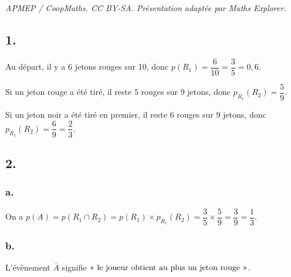 \documentclass[10pt]{article}
\begin{document}
\noindent\textit{APMEP / CoopMaths. CC BY-SA. Présentation adaptée par Maths Explorer.}\par\medskip
\subsection*{1.}
	
	Au départ, il y a 6 jetons rouges sur 10, donc \(p(R_1) = \dfrac{6}{10} = \dfrac{3}{5} = 0,6\).
	
	Si un jeton rouge a été tiré, il reste 5 rouges sur 9 jetons, donc \(p_{R_1}(R_2) = \dfrac{5}{9}\).
	
	Si un jeton noir a été tiré en premier, il reste 6 rouges sur 9 jetons, donc \(p_{\overline{R_1}}(R_2) = \dfrac{6}{9} = \dfrac{2}{3}\).
	
	\begin{center}
	\end{center}
	
	\subsection*{2.}
	
	\subsubsection*{a.}
	
	On a \(p(A) = p(R_1 \cap R_2) = p(R_1) \times p_{R_1}(R_2) = \dfrac{3}{5} \times \dfrac{5}{9} = \dfrac{3}{9} = \dfrac{1}{3}\).
	
	\subsubsection*{b.}
	
	L'évènement \(\overline{A}\) signifie \(\text{\guillemotleft{} le joueur obtient au plus un jeton rouge \guillemotright{}}\).
	
\end{document}
